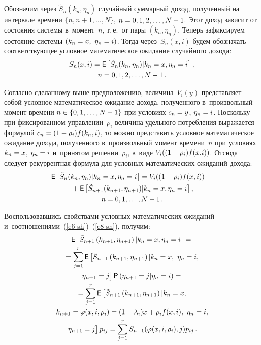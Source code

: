 \begin{multicols}{2}
     Обозначим через $\tilde{S}_n(k_n,\eta_n)$ случайный суммарный доход, 
полученный на интервале времени $\{n, n+1, \ldots , N\}$, $n\hm= 0,1,2,\ldots , N\hm-
1$. Этот доход зависит от со\-сто\-яния сис\-те\-мы в~момент~$n$, т.\,е.\ от пары 
$(k_n,\eta_n)$. Теперь зафиксируем со\-сто\-яние сис\-те\-мы $(k_n\hm=x,\ \eta_n\hm=i)$. 
Тогда через~$S_n(x,i)$ будем обозначать со\-от\-вет\-ст\-ву\-ющее услов\-ное 
математическое ожидание случайного дохода: 
     \begin{multline*}
     S_n(x,i)= {\sf E}\left[ \tilde{S}_n(k_n,\eta_n)\vert k_n=x, \eta_n=i\right]\,,\\
     n=0,1,2,\ldots , N-1\,.
     \end{multline*}
     
     Согласно сделанному выше предположению, величина~$V_i(y)$ 
представляет собой условное математическое ожидание дохода, полученного 
в~произвольный момент времени $n\hm\in \{0,1,\ldots , N\hm-1\}$ при условиях 
$c_n\hm=y$, $\eta_n\hm=i$. Поскольку при фиксированном управ\-ле\-нии~$\rho_i$ 
величина удельного по\-треб\-ле\-ния выражается формулой $c_n\hm= (1\hm- 
\rho_i)f(k_n,i)$, то мож\-но пред\-ста\-вить условное математическое ожидание дохода, 
полученного \mbox{в~произвольный} момент времени~$n$ при условиях $k_n\hm= x$, 
$\eta_n\hm=i$ и~принятом решении~$\rho_i$, в~виде $V_i((1\hm- \rho_i)f(x.i))$. 
Отсюда следует рекуррентная формула для условных математических ожиданий 
дохода:
     \begin{multline}
     {\sf E}\left[ \tilde{S}_n(k_n,\eta_n)\vert k_n=x, \eta_n=i\right]= V_i ((1-\rho_i) 
f(x,i))+{}\\
     {}+ {\sf E} \left[ \tilde{S}_{n+1}(k_{n+1},\eta_{n+1})\vert 
k_n=x,\eta_n=i\right],\\
 n=0,1,\ldots , N-1\,.
     \label{e9-sh}
     \end{multline}
     
     Воспользовавшись свойствами условных математических ожиданий 
и~соотношениями~(\ref{e6-sh})--(\ref{e8-sh}), получим:
     \begin{multline}
     {\sf E} \left[ \tilde{S}_{n+1} \left( k_{n+1},\eta_{n+1}\right )\vert 
k_n=x,\eta_n=i\right]={}\\
     {}=
     \sum\limits^r_{j=1} {\sf E} \left[ \tilde{S}_{n+1} \left( k_{n+1},\eta_{n+1}\right) 
\vert k_n=x,\ \eta_n=i,\right.\\
\left. \eta_{n+1}=j
     \vphantom{\tilde{S}_{n+1}}
     \right] {\sf P} \left( \eta_{n+1}=j\vert \eta_n=i\right) 
={}\\
     {}=\sum\limits^r_{j=1} {\sf E} \left[ \tilde{S}_{n+1} 
     \left( k_{n+1},\eta_{n+1}\right) \vert k_n=x,\right.\\ 
k_{n+1}=\varphi(x,i,\rho_i)=(1-\lambda_i)x+\rho_i f(x,i),\ \eta_n=i,\\
\left.  \eta_{n+1}=j
     \vphantom{\tilde{S}_{n+1}}
     \right] p_{ij}=\sum\limits^r_{j=1} S_{n+1}(\varphi(x,i,\rho_i),j) p_{ij}\,.
     \label{e10-sh}
     \end{multline}
     

\end{multicols}
